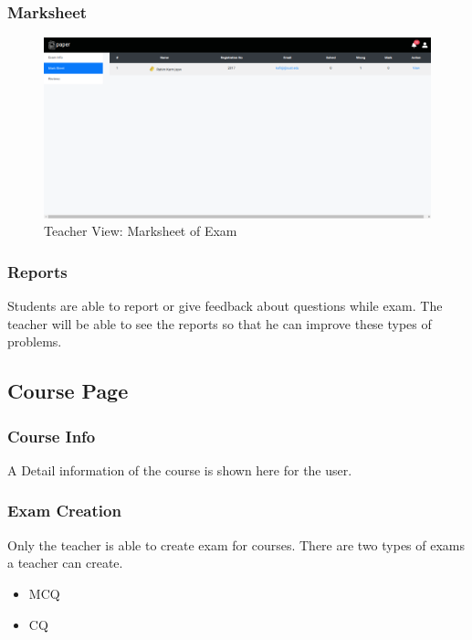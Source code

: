 \documentclass[10pt]{article}
\begin{document}
\subsubsection{Marksheet}

\begin{figure}[H]
  \centering
  \centerline{\includegraphics[width=\textwidth]{teacher/marksheet.png}}
  \caption{Teacher View: Marksheet of Exam}
  \label{fig}
\end{figure}

\subsubsection{Reports}

Students are able to report or give feedback about questions while exam. The teacher will be able to see the reports so that he can improve these types of problems.

\subsection{Course Page}


\subsubsection{Course Info}

A Detail information of the course is shown here for the user.

\subsubsection{Exam Creation}

Only the teacher is able to create exam for courses. There are two types of exams a teacher can create.

\begin{itemize}
  \item MCQ
  \item CQ
\end{itemize}
\end{document}
